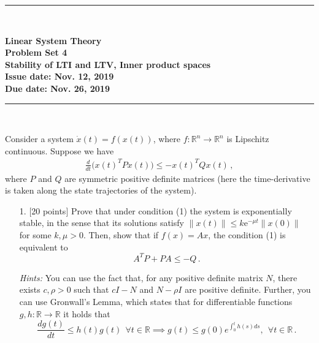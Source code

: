 \documentclass[a4paper,10.5pt]{article}
\newcommand{\R}{\mathbb{R}}
\begin{document}
\thispagestyle{plain}

\vspace*{-1.5cm}
{\noindent \rule{15.8cm}{.3mm} \\[.3cm]}
\begin{center} \bf
{\large Linear System Theory \medskip \\
Problem Set 4 \\
Stability of LTI and LTV, Inner product spaces \medskip
\\ Issue date: Nov. 12, 2019 \\ Due date: Nov. 26, 2019}
\end{center}
\rule{15.8cm}{.3mm} \\[1cm]


Consider a system $\dot{x}(t)=f(x(t))$, where $f: \R^n \rightarrow \R^n$ is Lipschitz continuous. Suppose we have
\begin{align}
\frac{d}{dt}\big(x(t)^TPx(t)\big)\leq -x(t)^TQx(t)\,, \tag{1}
\end{align}
where $P$ and $Q$ are symmetric positive definite matrices (here the time-derivative is taken along the state trajectories of the system). 

\begin{itemize}
\item[1.] $[$20 points$]$ Prove that under  condition (1) the system is exponentially stable, in the sense that its solutions satisfy $\|x(t)\|\leq k$e$^{-\mu t} \|x(0)\|$ for some $k, \mu > 0$. Then, show that if $f(x) = Ax$, the condition (1) is equivalent to 
\begin{equation}
A^TP + PA \leq -Q \tag{2}\,.
\end{equation}

{\em Hints:} You can use the fact that, for any positive definite matrix $N$,  there exists $c,\rho> 0$ such that $c I-N$ and $N-\rho I$ are positive definite. Further, you can use Gronwall's Lemma, which states that for  differentiable functions $g,h:\mathbb{R}\rightarrow \mathbb{R}$ it holds that
\begin{equation*}
\frac{d g(t)}{dt}\leq h(t)g(t)~~ \forall t\in \mathbb{R} \implies g(t)\leq g(0) e^{\int_0^t h(s) ds},~~\forall t \in \mathbb{R}\,.
\end{equation*}
\end{itemize}
	
\end{document}
